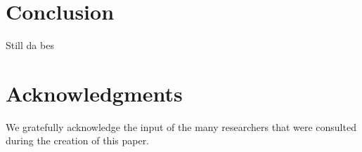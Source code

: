 \documentclass[a4paper,fleqn,usenatbib]{mnras}
\begin{document}
\section{Conclusion}
\label{sec:conclusion}



Still da bes


\section*{Acknowledgments}

We gratefully acknowledge the input of the many researchers that were consulted during the creation of this paper.





\bsp	%
\label{lastpage}
\end{document}
